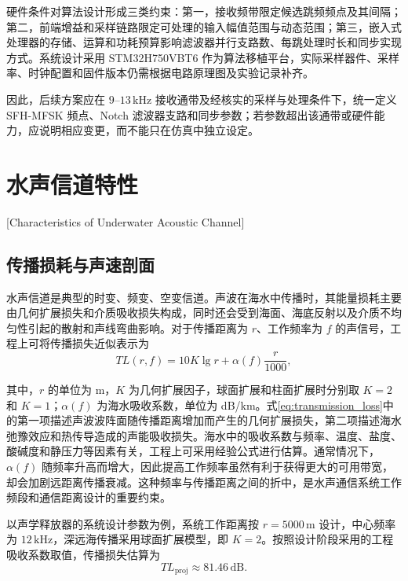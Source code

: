硬件条件对算法设计形成三类约束：第一，接收频带限定候选跳频频点及其间隔；第二，前端增益和采样链路限定可处理的输入幅值范围与动态范围；第三，嵌入式处理器的存储、运算和功耗预算影响滤波器并行支路数、每跳处理时长和同步实现方式。系统设计采用 STM32H750VBT6 作为算法移植平台，实际采样器件、采样率、时钟配置和固件版本仍需根据电路原理图及实验记录补齐。

因此，后续方案应在 $9$--$13\,\mathrm{kHz}$ 接收通带及经核实的采样与处理条件下，统一定义 SFH-MFSK 频点、Notch 滤波器支路和同步参数；若参数超出该通带或硬件能力，应说明相应变更，而不能只在仿真中独立设定。

\section{水声信道特性}[Characteristics of Underwater Acoustic Channel]

\subsection{传播损耗与声速剖面}

水声信道是典型的时变、频变、空变信道。声波在海水中传播时，其能量损耗主要由几何扩展损失和介质吸收损失构成，同时还会受到海面、海底反射以及介质不均匀性引起的散射和声线弯曲影响。对于传播距离为 $r$、工作频率为 $f$ 的声信号，工程上可将传播损失近似表示为
\begin{equation}
  TL(r,f) = 10K\lg r + \alpha(f)\frac{r}{1000},
  \label{eq:transmission_loss}
\end{equation}

其中，$r$ 的单位为 m，$K$ 为几何扩展因子，球面扩展和柱面扩展时分别取 $K=2$ 和 $K=1$；$\alpha(f)$ 为海水吸收系数，单位为 dB/km。式\eqref{eq:transmission_loss}中的第一项描述声波波阵面随传播距离增加而产生的几何扩展损失，第二项描述海水弛豫效应和热传导造成的声能吸收损失。海水中的吸收系数与频率、温度、盐度、酸碱度和静压力等因素有关，工程上可采用经验公式进行估算\cite{ainslieSimplifiedFormulaViscous1998}。通常情况下，$\alpha(f)$ 随频率升高而增大，因此提高工作频率虽然有利于获得更大的可用带宽，却会加剧远距离传播衰减。这种频率与传播距离之间的折中，是水声通信系统工作频段和通信距离设计的重要约束\cite{hovemRayTraceModeling2013,stojanovicRelationshipCapacityDistance2006,vanWalreePropagationScatteringEffects2013}。

以声学释放器的系统设计参数为例，系统工作距离按 $r=5000\,\mathrm{m}$ 设计，中心频率为 $12\,\mathrm{kHz}$，深远海传播采用球面扩展模型，即 $K=2$。按照设计阶段采用的工程吸收系数取值，传播损失估算为
\begin{equation}
  TL_{\mathrm{proj}} \approx 81.46\,\mathrm{dB}.
  \label{eq:project_transmission_loss}
\end{equation}

